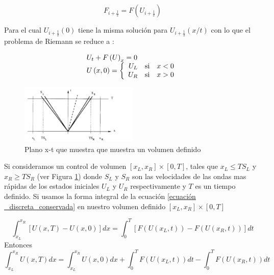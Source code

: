 \documentclass[12pt,a4paper]{book}
\begin{document}
\begin{equation}
F_{i+\frac{1}{2}}=F \left( U_{i+\frac{1}{2}} \right)
\end{equation}

Para el cual $U_{i+\frac{1}{2}}(0)$ tiene la misma solución para $U_{i+\frac{1}{2}}(x/t)$ con lo que el problema de Riemann se reduce a :

\begin{equation} \label{ecuación  _discreta_conservada}
\begin{array}{ll}
U_t + F \left( U \right)_x = 0 \\
U \left(x,0 \right) = 
\left\lbrace
\begin{array}{rr}
U_L \quad \textup{si} \quad x<0  \\
U_R \quad \textup{si} \quad x>0
\end{array}
\right.
\end{array}
\end{equation}

\begin{figure} %
  \centering
    \includegraphics[width=0.5\textwidth]{Figuras/HLL_onda.png}
  \caption{Plano x-t que muestra que muestra un volumen definido}
  \label{fig:Plano x_t}
\end{figure}

Si consideramos un control de volumen $\left[x_L, x_R \right]\times \left[ 0 , T \right]$, tales que $x_L \leq TS_L$ y $x_R \geq TS_R$ (ver Figura \ref{fig:Plano x_t}) donde $S_L$ y $S_R$ son las velocidades de las ondas mas rápidas de los 
estados iniciales $U_L$ y $U_R$ respectivamente y $T$ es un tiempo definido. Si usamos la forma integral de la 
ecuación   \ref{ecuación  _discreta_conservada} en nuestro volumen definido $\left[x_L, x_R \right]\times \left[ 0 , T \right]$

\begin{equation*}\label{Forma_integral_conservadas}
\int_{x_L}^{x_R} \left[ U\left( x, T \right) -
 U\left( x, 0 \right) \right] dx = 
 \int_{0}^{T} \left[ F \left(U\left( x_L, t \right) \right) -
 F \left(U\left( x_R, t \right) \right) \right] dt 
\end{equation*}
Entonces
\begin{equation}\label{integral_consistencia}
\int_{x_L}^{x_R} U\left( x, T \right) dx =\int_{x_L}^{x_R} U\left( x, 0 \right) dx+
\int_{0}^{T}  F \left(U\left( x_L, t \right) \right)dt -
\int_{0}^{T}  F \left(U\left( x_R, t \right) \right) dt
\end{equation}
\end{document}
